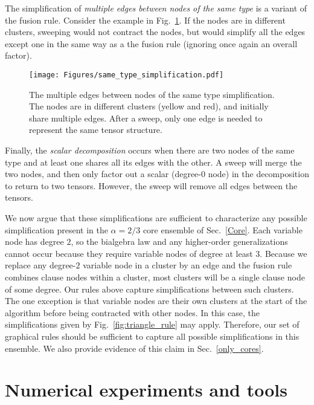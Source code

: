 The simplification of \emph{multiple edges between nodes of the same type} is a variant of the fusion rule.
Consider the example in Fig.~\ref{fig:same_type_simplification}.
If the nodes are in different clusters, sweeping would not contract the nodes, but would simplify all the edges except one in the same way as a the fusion rule (ignoring once again an overall factor).
\begin{figure}[htbp]
    \centering
    \texttt{[image: Figures/same\_type\_simplification.pdf]}
    \caption{\label{fig:same_type_simplification}The multiple edges between nodes of the same type simplification.
    The nodes are in different clusters (yellow and red), and initially share multiple edges.
    After a sweep, only one edge is needed to represent the same tensor structure.}
\end{figure}

Finally, the \emph{scalar decomposition} occurs when there are two nodes of the same type and at least one shares all its edges with the other.
A sweep will merge the two nodes, and then only factor out a scalar (degree-$0$ node) in the decomposition to return to two tensors.
However, the sweep will remove all edges between the tensors.

We now argue that these simplifications are sufficient to characterize any possible simplification present in the $\alpha = 2/3$ core ensemble of Sec.~\ref{Core}.
Each variable node has degree $2$, so the bialgebra law and any higher-order generalizations cannot occur because they require variable nodes of degree at least $3$.
Because we replace any degree-$2$ variable node in a cluster by an edge and the fusion rule combines clause nodes within a cluster, most clusters will be a single clause node of some degree.
Our rules above capture simplifications between such clusters.
The one exception is that variable nodes are their own clusters at the start of the algorithm before being contracted with other nodes.
In this case, the simplifications given by Fig.~\ref{fig:triangle_rule} may apply.
Therefore, our set of graphical rules should be sufficient to capture all possible simplifications in this ensemble.
We also provide evidence of this claim in Sec.~\ref{only_cores}.


\section{Numerical experiments and tools}
